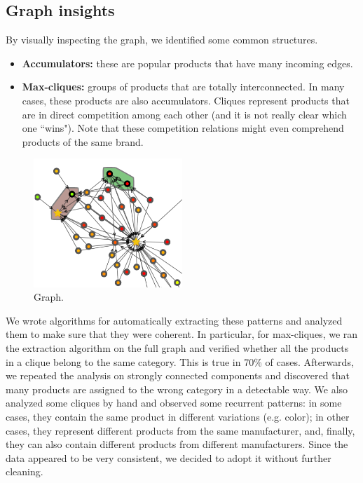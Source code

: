 \documentclass[11pt]{article}
\begin{document}
\subsection{Graph insights}
By visually inspecting the graph, we identified some common structures.
\begin{itemize}
	\item \textbf{Accumulators:} these are popular products that have many incoming edges.
	\item \textbf{Max-cliques:} groups of products that are totally interconnected. In many cases, these products are also accumulators. Cliques represent products that are in direct competition among each other (and it is not really clear which one ``wins"). Note that these competition relations might even comprehend products of the same brand.
\end{itemize}
\begin{figure}
	\centering{}
	\includegraphics[width=0.5\textwidth]{img/graph.png}
	\caption{Graph.}
	\label{fig:graph}
\end{figure}
We wrote algorithms for automatically extracting these patterns and analyzed them to make sure that they were coherent. In particular, for max-cliques, we ran the extraction algorithm on the full graph and verified whether all the products in a clique belong to the same category. This is true in 70\% of cases. Afterwards, we repeated the analysis on strongly connected components and discovered that many products are assigned to the wrong category in a detectable way. We also analyzed some cliques by hand and observed some recurrent patterns: in some cases, they contain the same product in different variations (e.g. color); in other cases, they represent different products from the same manufacturer, and, finally, they can also contain different products from different manufacturers. Since the data appeared to be very consistent, we decided to adopt it without further cleaning.
\end{document}
